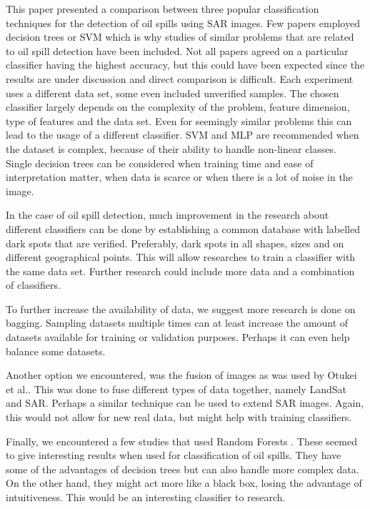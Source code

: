 This paper presented a comparison between three popular classification techniques for the detection of oil spills using SAR images. Few papers employed decision trees or SVM which is why studies of similar problems that are related to oil spill detection have been included. Not all papers agreed on a particular classifier having the highest accuracy, but this could have been expected since the results are under discussion and direct comparison is difficult. Each experiment uses a different data set, some even included unverified samples. The chosen classifier largely depends on the complexity of the problem, feature dimension, type of features and the data set. Even for seemingly similar problems this can lead to the usage of a different classifier. SVM and MLP are recommended when the dataset is complex, because of their ability to handle non-linear classes. Single decision trees can be considered when training time and ease of interpretation matter, when data is scarce or when there is a lot of noise in the image. 

In the case of oil spill detection, much improvement in the research about different classifiers can be done by establishing a common database with labelled dark spots that are verified. Preferably, dark spots in all shapes, sizes and on different geographical points. This will allow researches to train a classifier with the same data set. Further research could include more data and a combination of classifiers.

To further increase the availability of data, we suggest more research is done on bagging. Sampling datasets multiple times can at least increase the amount of datasets available for training or validation purposes. Perhaps it can even help balance some datasets.

Another option we encountered, was the fusion of images as was used by Otukei et al.\cite{Otukei2010S27}. This was done to fuse different types of data together, namely LandSat and SAR. Perhaps a similar technique can be used to extend SAR images. Again, this would not allow for new real data, but might help with training classifiers.

Finally, we encountered a few studies that used Random Forests \cite{Topouzelis201268, Xu201414}. These seemed to give interesting results when used for classification of oil spills. They have some of the advantages of decision trees but can also handle more complex data. On the other hand, they might act more like a black box, losing the advantage of intuitiveness. This would be an interesting classifier to research.